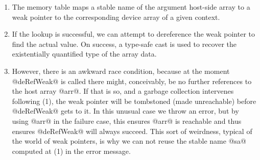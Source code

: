 %
\begin{enumerate}
\item The memory table maps a stable name of the argument host-side array to a
    weak pointer to the corresponding device array of a given context.

\item If the lookup is successful, we can attempt to dereference the weak
    pointer to find the actual value. On success, a type-safe cast is used to
    recover the existentially quantified type of the array data.

\item However, there is an awkward race condition, because at the moment
    @deRefWeak@ is called there might, conceivably, be no further references to
    the host array @arr@. If that is so, and a garbage collection intervenes
    following (1), the weak pointer will be tombstoned (made unreachable) before
    @deRefWeak@ gets to it. In this unusual case we throw an error, but by
    using @arr@ in the failure case, this ensures @arr@ is reachable and thus
    ensures @deRefWeak@ will always succeed. This sort of weirdness, typical of
    the world of weak pointers, is why we can not reuse the stable name @sa@
    computed at (1) in the error message.
\end{enumerate}



